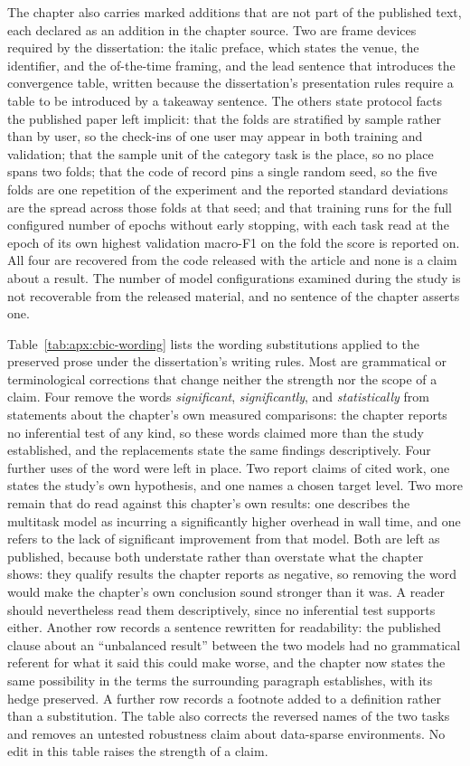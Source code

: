The chapter also carries marked additions that are not part of the published text, each
declared as an addition in the chapter source. Two are frame devices required by the
dissertation: the italic preface, which states the venue, the identifier, and the
of-the-time framing, and the lead sentence that introduces the convergence table, written
because the dissertation's presentation rules require a table to be introduced by a
takeaway sentence. The others state protocol facts the published paper left implicit: that
the folds are stratified by sample rather than by user, so the check-ins of one user may
appear in both training and validation; that the sample unit of the category task is the
place, so no place spans two folds; that the code of record pins a single random seed, so
the five folds are one repetition of the experiment and the reported standard deviations
are the spread across those folds at that seed; and that training runs for the full
configured number of epochs without early stopping, with each task read at the epoch of
its own highest validation macro-F1 on the fold the score is reported on. All four are
recovered from the code released with the article and none is a claim about a result. The
number of model configurations examined during the study is not recoverable from
the released material, and no sentence of the chapter asserts one.

Table~\ref{tab:apx:cbic-wording} lists the wording substitutions applied to the
preserved prose under the dissertation's writing rules. Most are grammatical or
terminological corrections that change neither the strength nor the scope of a claim.
Four remove the words
\emph{significant}, \emph{significantly}, and \emph{statistically} from statements
about the chapter's own measured comparisons: the chapter reports no inferential test of
any kind, so these words claimed more than the study established, and the replacements
state the same findings descriptively. Four further uses of the word were left in place.
Two report claims of cited work, one states the study's own hypothesis, and one names a
chosen target level. Two more remain that do read against this chapter's own results:
one describes the multitask model as incurring a significantly higher overhead in wall
time, and one refers to the lack of significant improvement from that model. Both are
left as published, because both understate rather than overstate what the chapter shows:
they qualify results the chapter reports as negative, so removing the word would make the
chapter's own conclusion sound stronger than it was. A reader should nevertheless read
them descriptively, since no inferential test supports either. Another row records a
sentence rewritten for readability: the published clause about an ``unbalanced result'' between
the two models had no grammatical referent for what it said this could make worse, and the
chapter now states the same possibility in the terms the surrounding paragraph establishes,
with its hedge preserved. A further row records a footnote added to a definition rather than
a substitution. The table also corrects the reversed names of the two tasks and removes an
untested robustness claim about data-sparse environments. No edit in this table raises the
strength of a claim.

